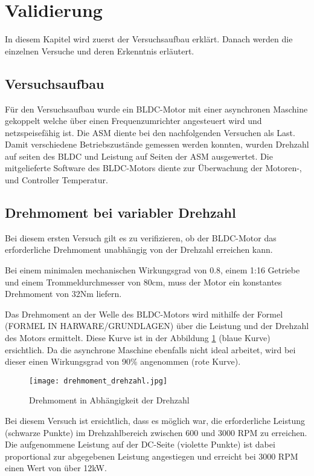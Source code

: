 \section{Validierung}\label{sec:Validierung}
In diesem Kapitel wird zuerst der Versuchsaufbau erklärt. Danach werden die einzelnen Versuche und deren Erkenntnis erläutert.

\subsection{Versuchsaufbau}\label{subsec:Versuchsaufbau}
Für den Versuchsaufbau wurde ein BLDC-Motor mit einer asynchronen Maschine gekoppelt welche über einen Frequenzumrichter angesteuert wird und netzspeisefähig ist. Die ASM diente bei den nachfolgenden Versuchen als Last. Damit verschiedene Betriebszustände gemessen werden konnten, wurden Drehzahl auf seiten des BLDC und Leistung auf Seiten der ASM ausgewertet. Die mitgelieferte Software des BLDC-Motors diente zur Überwachung der Motoren-, und Controller Temperatur.


\subsection{Drehmoment bei variabler Drehzahl}\label{subsec:DrehmomentDrehzahl}
Bei diesem ersten Versuch gilt es zu verifizieren, ob der BLDC-Motor das erforderliche Drehmoment unabhängig von der Drehzahl erreichen kann.

Bei einem minimalen mechanischen Wirkungsgrad von 0.8, einem 1:16 Getriebe und einem Trommeldurchmesser von 80cm, muss der Motor ein konstantes Drehmoment von 32Nm liefern.

Das Drehmoment an der Welle des BLDC-Motors wird mithilfe der Formel (FORMEL IN HARWARE/GRUNDLAGEN) über die Leistung und der Drehzahl des Motors ermittelt. Diese Kurve ist in der Abbildung \ref{fig:drehmoment/drehzahl} (blaue Kurve) ersichtlich. Da die asynchrone Maschine ebenfalls nicht ideal arbeitet, wird bei dieser einen Wirkungsgrad von 90\% angenommen (rote Kurve). 

\begin{figure}[H]
	\centering
	\texttt{[image: drehmoment\_drehzahl.jpg]}
	\caption{Drehmoment in Abhängigkeit der Drehzahl}\label{fig:drehmoment/drehzahl}
\end{figure}

Bei diesem Versuch ist ersichtlich, dass es möglich war, die erforderliche Leistung (schwarze Punkte) im Drehzahlbereich zwischen 600 und 3000 RPM zu erreichen. Die aufgenommene Leistung auf der DC-Seite (violette Punkte) ist dabei proportional zur abgegebenen Leistung angestiegen und erreicht bei 3000 RPM einen Wert von über 12kW.

